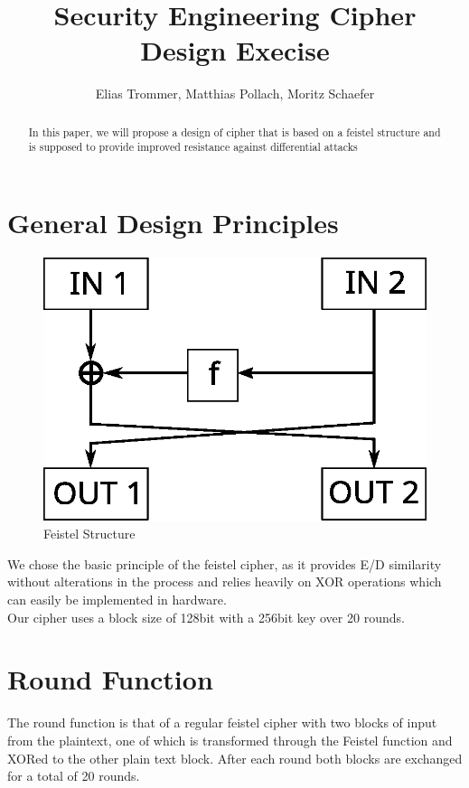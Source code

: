 \documentclass[a4paper]{article}
\begin{document}
    \title{Security Engineering Cipher Design Execise}
    \author{Elias Trommer, Matthias Pollach, Moritz Schaefer}
    \maketitle
    \begin{abstract}
	In this paper, we will propose a design of cipher that is based on a feistel structure and is supposed to provide improved resistance against differential attacks
    \end{abstract}
    \section{General Design Principles}
        \begin{figure}[h!]
	\centering
	\includegraphics[scale=.4]{feistelstruc.eps}
	\caption{Feistel Structure}
	\label{fig:feistel}
    \end{figure}
 We chose the basic principle of the feistel cipher, as it provides E/D similarity without alterations in the process and relies heavily on XOR operations which can easily be implemented in hardware.\\[0.5em]
    Our cipher uses a block size of 128bit with a 256bit key over 20 rounds. 
    \section{Round Function}
	The round function is that of a regular feistel cipher with two blocks of input from the plaintext, one of which is transformed through the Feistel function and XORed to the other plain text block. After each round both blocks are exchanged for a total of 20 rounds.
\end{document}

